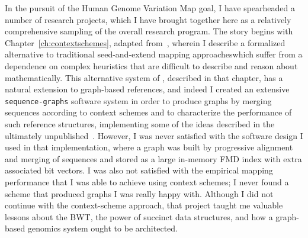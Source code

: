 In the pursuit of the Human Genome Variation Map goal, I have spearheaded a number of research projects, which I have brought together here as a relatively comprehensive sampling of the overall research program. The story begins with Chapter~\ref{ch:contextschemes}, adapted from~\citet{novak2015canonical}, wherein I describe a formalized alternative to traditional seed-and-extend mapping approacheswhich suffer from a dependence on complex heuristics that are difficult to describe and reason about mathematically. This alternative system of , described in that chapter, has a natural extension to graph-based references, and indeed I created an extensive \texttt{sequence-graphs} software system in order to produce graphs by merging sequences according to context schemes and to characterize the performance of such reference structures, implementing some of the ideas described in the ultimately unpublished~\citet{paten2014mapping}. However, I was never satisfied with the software design I used in that implementation, where a graph was built by progressive alignment and merging of sequences and stored as a large in-memory FMD index with extra associated bit vectors. I was also not satisfied with the empirical mapping performance that I was able to achieve using context schemes; I never found a scheme that produced graphs I was really happy with. Although I did not continue with the context-scheme approach, that project taught me valuable lessons about the BWT, the power of succinct data structures, and how a graph-based genomics system ought to be architected.



